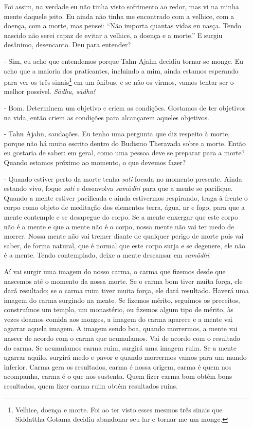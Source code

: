 Foi assim, na verdade eu não tinha visto sofrimento ao redor, mas vi
na minha mente daquele jeito. Eu ainda não tinha me encontrado com a
velhice, com a doença, com a morte, mas pensei: “Não importa quantas
vidas eu nasça. Tendo nascido não serei capaz de evitar a velhice, a
doença e a morte.” E surgiu desânimo, desencanto. Deu para entender?

- Sim, eu acho que entendemos porque Tahn Ajahn\textit{ }decidiu
tornar-se monge. Eu acho que a maioria dos praticantes, incluindo a
mim, ainda estamos esperando para ver os três sinais\footnote{Velhice,
doença e morte. Foi ao ter visto esses mesmos três sinais que Siddattha
Gotama decidiu abandonar seu lar e tornar-me um monge. } em um ônibus,
e se não os virmos, vamos tentar ser o melhor possível.
\textit{S\=adhu, s\=adhu!}

- Bom. Determinem um objetivo e criem as condições. Gostamos de
ter objetivos na vida, então criem as condições para alcançarem aqueles
objetivos. 

- Tahn Ajahn, saudações. Eu tenho uma pergunta que diz respeito à
morte, porque não há muito escrito dentro do Budismo Theravada sobre a
morte. Então eu gostaria de saber: em geral, como uma pessoa deve se
preparar para a morte? Quando estamos próximo ao momento, o que devemos
fazer?

- Quando estiver perto da morte tenha \textit{sati }focada no
momento presente. Ainda estando vivo, foque \textit{sati }e desenvolva
\textit{sam\=adhi }para que a mente se pacifique. Quando a mente
estiver pacificada e ainda estivermos respirando, traga à frente o
corpo como objeto de meditação dos elementos terra, água, ar e fogo,
para que a mente contemple e se desapegue do corpo. Se a mente enxergar
que este corpo não é a mente e que a mente não é o corpo, nossa mente
não vai ter medo de morrer. Nossa mente não vai tremer diante de
qualquer perigo de morte pois vai saber, de forma natural, que é normal
que este corpo surja e se degenere, ele não é a mente. Tendo
contemplado, deixe a mente descansar em \textit{sam\=adhi}.

Aí vai surgir uma imagem do nosso carma, o carma que fizemos desde
que nascemos até o momento da nossa morte. Se o carma bom tiver muita
força, ele dará resultado; se o carma ruim tiver muita força, ele dará
resultado. Haverá uma imagem do carma surgindo na mente. Se fizemos
mérito, seguimos os preceitos, construímos um templo, um monastério, ou
fizemos algum tipo de mérito, às vezes doamos comida aos monges, a
imagem do carma aparece e a mente vai agarrar aquela imagem. A imagem
sendo boa, quando morrermos, a mente vai nascer de acordo com o carma
que acumulamos. Vai de acordo com o resultado do carma. Se acumulamos
carma ruim, surgirá uma imagem ruim. Se a mente agarrar aquilo, surgirá
medo e pavor e quando morrermos vamos para um mundo inferior. Carma
gera os resultados, carma é nossa origem, carma é quem nos acompanha,
carma é o que nos sustenta. Quem fizer carma bom obtém bons resultados,
quem fizer carma ruim obtém resultados ruins.

